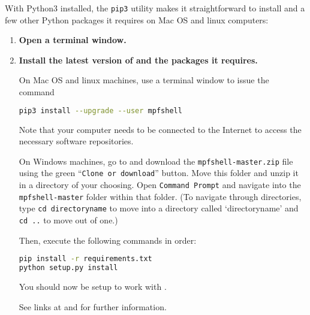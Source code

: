 With Python3 installed, the \texttt{pip3} utility makes it straightforward to install \mpfshell and a few other Python packages it requires on Mac OS and linux computers:
\begin{enumerate}
	\item \textbf{Open a terminal window.}
	\item \textbf{Install the latest version of \mpfshell and the packages it requires.}
	
	On Mac OS and linux machines, use a terminal window to issue the command
\begin{lstlisting}[language=bash]
pip3 install --upgrade --user mpfshell
\end{lstlisting}
		Note that your computer needs to be connected to the Internet to access the necessary software repositories.
		
		\smallskip
		On Windows machines, go to  and download the
		 \lstinline{mpfshell-master.zip} file using the green ``\texttt{Clone or download}'' button. 
		Move this folder and unzip it in a directory of your choosing. 
		Open \lstinline{Command Prompt} and navigate into the \texttt{mpfshell-master} folder within that folder. 
		(To navigate through directories, type \lstinline{cd directoryname} to move into a directory called ‘directoryname’ and \lstinline{cd ..} to move out of one.)
		
		Then, execute the following commands in order:
\begin{lstlisting}[language=bash]
pip install -r requirements.txt
python setup.py install
\end{lstlisting}
		You should now be setup to work with \mpfshell.
		
		See links at  and  for further information.
\end{enumerate}

